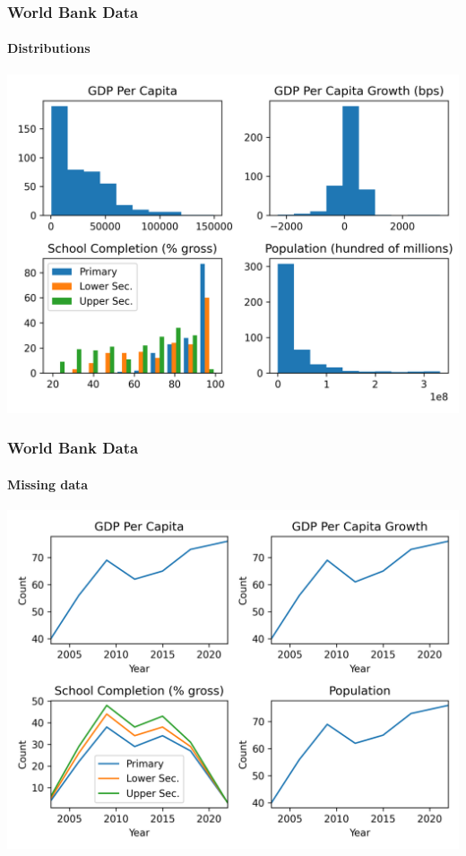 \documentclass[10pt]{beamer}
\begin{document}
\begin{frame}
    \frametitle{World Bank Data}
    \framesubtitle{Distributions}
    \centering
    \includegraphics[width=\textwidth]{../charts/wdi.png}
\end{frame}

\begin{frame}
    \frametitle{World Bank Data}
    \framesubtitle{Missing data}
    \centering
    \includegraphics[width=\textwidth]{../charts/wdi-count.png}
\end{frame}
\end{document}
